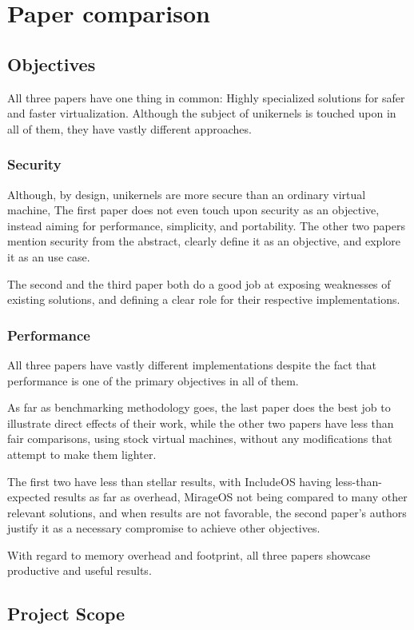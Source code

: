 \documentclass[12pt]{article}
\begin{document}
\section{Paper comparison}

\subsection{Objectives}
All three papers have one thing in common: Highly specialized solutions for safer and faster virtualization. Although the subject of unikernels
is touched upon in all of them, they have vastly different approaches.

\subsubsection{Security}
Although, by design, unikernels are more secure than an ordinary virtual machine, The first paper does not even touch upon security as an
objective, instead aiming for performance, simplicity, and portability. The other two papers mention security from the abstract, clearly define
it as an objective, and explore it as an use case.

The second and the third paper both do a good job at exposing weaknesses of existing solutions, and defining a clear role
for their respective implementations.

\subsubsection{Performance}
All three papers have vastly different implementations despite the fact that performance is one of the primary objectives in all of them.

As far as benchmarking methodology goes, the last paper does the best job to illustrate direct effects of their work, while the other two
papers have less than fair comparisons, using stock virtual machines, without any modifications that attempt to make them lighter.

The first two have less than stellar results, with IncludeOS having less-than-expected results as far as overhead, MirageOS not being compared
to many other relevant solutions, and when results are not favorable, the second paper's authors justify it as a necessary compromise to
achieve other objectives.

With regard to memory overhead and footprint, all three papers showcase productive and useful results.

\subsection{Project Scope}
\end{document}
